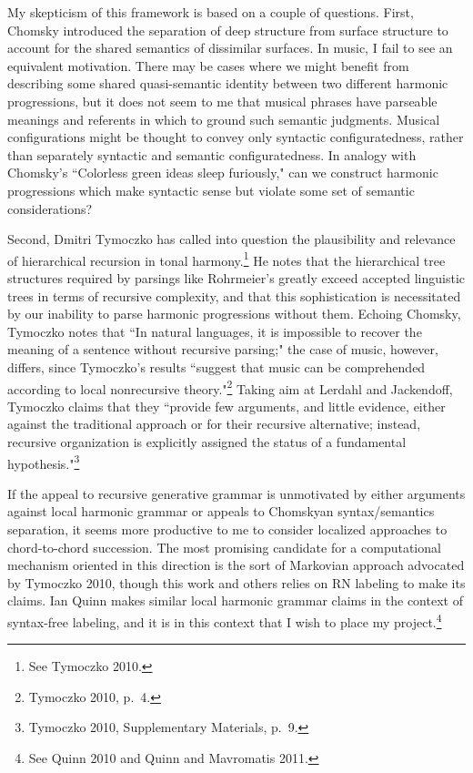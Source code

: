 My skepticism of this framework is based on a couple of questions.  First, Chomsky introduced the separation of deep structure from surface structure to account for the shared semantics of dissimilar surfaces.  In music, I fail to see an equivalent motivation.  There may be cases where we might benefit from describing some shared quasi-semantic identity between two different harmonic progressions, but it does not seem to me that musical phrases have parseable meanings and referents in which to ground such semantic judgments.  Musical configurations might be thought to convey only syntactic configuratedness, rather than separately syntactic and semantic configuratedness.  In analogy with Chomsky's ``Colorless green ideas sleep furiously," can we construct harmonic progressions which make syntactic sense but violate some set of semantic considerations?

Second, Dmitri Tymoczko has called into question the plausibility and relevance of hierarchical recursion in tonal harmony.\footnote{See Tymoczko 2010.}  He notes that the hierarchical tree structures required by parsings like Rohrmeier's greatly exceed accepted linguistic trees in terms of recursive complexity, and that this sophistication is necessitated by our inability to parse harmonic progressions without them.  Echoing Chomsky, Tymoczko notes that ``In natural languages, it is impossible to recover the meaning of a sentence without recursive parsing;" the case of music, however, differs, since Tymoczko's results ``suggest that music can be comprehended according to local nonrecursive theory."\footnote{Tymoczko 2010, p.\ 4.}  Taking aim at Lerdahl and Jackendoff, Tymoczko claims that they ``provide few arguments, and little evidence, either against the traditional approach or for their recursive alternative; instead, recursive organization is explicitly assigned the status of a fundamental hypothesis."\footnote{Tymoczko 2010, Supplementary Materials, p.\ 9.}

If the appeal to recursive generative grammar is unmotivated by either arguments against local harmonic grammar or appeals to Chomskyan syntax/semantics separation, it seems more productive to me to consider localized approaches to chord-to-chord succession.  The most promising candidate for a computational mechanism oriented in this direction is the sort of Markovian approach advocated by Tymoczko 2010, though this work and others relies on RN labeling to make its claims.  Ian Quinn makes similar local harmonic grammar claims in the context of syntax-free labeling, and it is in this context that I wish to place my project.\footnote{See Quinn 2010 and Quinn and Mavromatis 2011.}

